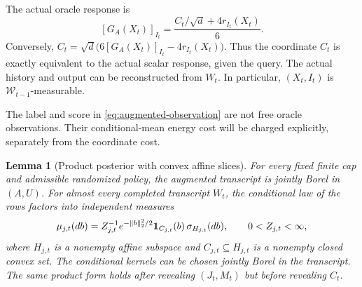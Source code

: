 \documentclass[11pt]{article}
\numberwithin{equation}{section}
\newtheorem{lemma}[lemma]{Lemma}
\theoremstyle{definition}
\theoremstyle{remark}
\newcommand{\one}{\mathbf 1}
\newcommand{\cW}{\mathcal W}
\DeclarePairedDelimiter{\norm}{\lVert}{\rVert}
\begin{document}
The actual oracle response is
\begin{equation}\label{eq:response-equivalence}
[G_A(X_t)]_{I_t}
=\frac{C_t/\sqrt d+4r_{I_t}(X_t)}6.
\end{equation}
Conversely, $C_t=\sqrt d\bigl(6[G_A(X_t)]_{I_t}-4r_{I_t}(X_t)\bigr)$. Thus the coordinate $C_t$ is exactly equivalent to the actual scalar response, given the query. The actual history and output can be reconstructed from $W_t$. In particular, $(X_t,I_t)$ is $\cW_{t-1}$-measurable.

The label and score in \eqref{eq:augmented-observation} are not free oracle observations. Their conditional-mean energy cost will be charged explicitly, separately from the coordinate cost.

\begin{lemma}[Product posterior with convex affine slices]\label{lem:posterior}
For every fixed finite cap and admissible randomized policy, the augmented transcript is jointly Borel in $(A,U)$. For almost every completed transcript $W_t$, the conditional law of the rows factors into independent measures
\begin{equation}\label{eq:posterior-density}
\mu_{j,t}(db)=Z_{j,t}^{-1}e^{-\norm{b}_2^2/2}
\one_{C_{j,t}}(b)\,\sigma_{H_{j,t}}(db),\qquad 0<Z_{j,t}<\infty,
\end{equation}
where $H_{j,t}$ is a nonempty affine subspace and $C_{j,t}\subseteq H_{j,t}$ is a nonempty closed convex set. The conditional kernels can be chosen jointly Borel in the transcript. The same product form holds after revealing $(J_t,M_t)$ but before revealing $C_t$.
\end{lemma}
\end{document}
